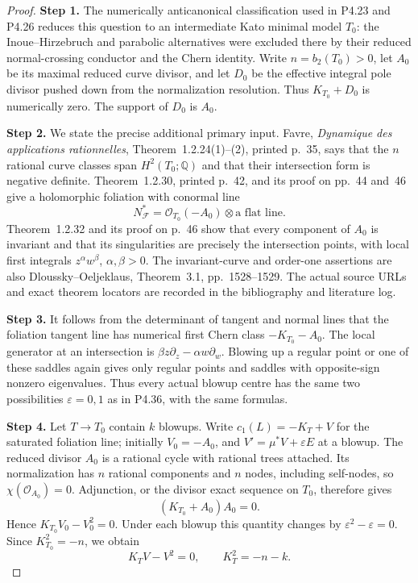 \begin{proof}
\noindent\textbf{Step 1.} The numerically anticanonical classification used in P4.23
and P4.26 reduces this question to an intermediate Kato
minimal model $T_0$: the Inoue--Hirzebruch and parabolic
alternatives were excluded there by their reduced
normal-crossing conductor and the Chern identity.
Write $n=b_2(T_0)>0$, let $A_0$ be its maximal reduced
curve divisor, and let $D_0$ be the effective integral
pole divisor pushed down from the normalization resolution.
Thus $K_{T_0}+D_0$ is numerically zero. The support of
$D_0$ is $A_0$.

\noindent\textbf{Step 2.} We state the precise additional primary input.
Favre, \emph{Dynamique des applications rationnelles},
Theorem~1.2.24(1)--(2), printed p.~35, says that the
$n$ rational curve classes span $H^2(T_0;\mathbb Q)$
and that their intersection form is negative definite.
Theorem~1.2.30, printed p.~42, and its proof on
pp.~44 and~46 give a holomorphic foliation with conormal
line
\[
 N_{\mathcal F}^*=\mathcal O_{T_0}(-A_0)
                       \otimes\text{a flat line}.
\]
Theorem~1.2.32 and its proof on p.~46 show that every
component of $A_0$ is invariant and that its singularities
are precisely the intersection points, with local
first integrals $z^\alpha w^\beta$, $\alpha,\beta>0$.
The invariant-curve and order-one assertions are also
Dloussky--Oeljeklaus, Theorem~3.1, pp.~1528--1529.
The actual source URLs and exact theorem locators are
recorded in the bibliography and literature log.

\noindent\textbf{Step 3.} It follows from the determinant of tangent and normal
lines that the foliation tangent line has numerical
first Chern class $-K_{T_0}-A_0$. The local generator
at an intersection is
$\beta z\partial_z-\alpha w\partial_w$.
Blowing up a regular point or one of these saddles
again gives only regular points and saddles with
opposite-sign nonzero eigenvalues. Thus every actual
blowup centre has the same two possibilities
$\varepsilon=0,1$ as in P4.36, with the same formulas.

\noindent\textbf{Step 4.} Let $T\to T_0$ contain $k$ blowups. Write
$c_1(L)=-K_T+V$ for the saturated foliation line;
initially $V_0=-A_0$, and
$V'=\mu^*V+\varepsilon E$ at a blowup.
The reduced divisor $A_0$ is a rational cycle with
rational trees attached. Its normalization has
$n$ rational components and $n$ nodes, including
self-nodes, so $\chi(\mathcal O_{A_0})=0$.
Adjunction, or the divisor exact sequence on $T_0$,
therefore gives
\[
 (K_{T_0}+A_0)A_0=0.
\]
Hence $K_{T_0}V_0-V_0^2=0$.
Under each blowup this quantity changes by
$\varepsilon^2-\varepsilon=0$.
Since $K_{T_0}^2=-n$, we obtain
\[
 K_TV-V^2=0,\qquad K_T^2=-n-k.
\]


\end{proof}
